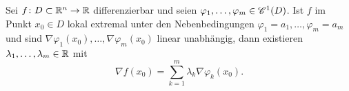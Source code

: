 \begin{thm}\label{thm1_11}
	Sei $f \colon D \subset \mathbb{R}^n \to \mathbb{R}$ differenzierbar und seien $\varphi_1, \dots, \varphi_m \in \mathscr{C}^1(D)$. Ist $f$ im Punkt $x_0 \in D$ lokal extremal unter den Nebenbedingungen $\varphi_1 = a_1, \dots, \varphi_m = a_m$ und sind $\nabla\varphi_1(x_0), \dots, \nabla \varphi_m(x_0)$ linear unabhängig, dann existieren $\lambda_1, \dots, \lambda_m \in \mathbb{R}$ mit
	\[\nabla f(x_0) = \sum_{k=1}^m \lambda_k \nabla \varphi_k(x_0).\]
\end{thm}
